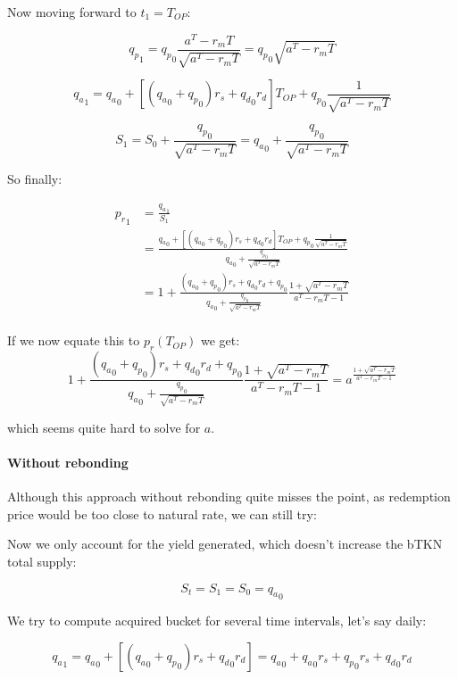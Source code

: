 \documentclass{article}
\begin{document}
Now moving forward to $t_1 = T_{OP}$:

\[
{q_p}_1 = {q_p}_0 \frac{a^T -r_mT}{\sqrt{a^T -r_mT}} = {q_p}_0 \sqrt{a^T - r_mT}
\]

\[
{q_a}_1 = {q_a}_0 + [({q_a}_0 + {q_p}_0)r_s + {q_d}_0 r_d] T_{OP} + {q_p}_0 \frac{1}{\sqrt{a^T - r_mT}}
\]

\[
S_1 = S_0 + \frac{{q_p}_0}{\sqrt{a^T - r_mT}} = {q_a}_0 + \frac{{q_p}_0}{\sqrt{a^T - r_mT}}
\]

So finally:

\begin{equation}
  \label{eq:conservative_p_r_1}
  \begin{split}
    {p_r}_1 & = \frac{{q_a}_1}{S_1} \\
    & = \frac{{q_a}_0 + [({q_a}_0 + {q_p}_0)r_s + {q_d}_0 r_d] T_{OP} + {q_p}_0 \frac{1}{\sqrt{a^T - r_mT}}}{{q_a}_0 + \frac{{q_p}_0}{\sqrt{a^T - r_mT}}} \\
    & = 1 + \frac{({q_a}_0 + {q_p}_0)r_s + {q_d}_0 r_d + {q_p}_0}{{q_a}_0 + \frac{{q_p}_0}{\sqrt{a^T - r_mT}}} \frac{1+ \sqrt{a^T - r_mT}}{a^T - r_mT - 1} \\
  \end{split}
\end{equation}

If we now equate this to $p_r(T_{OP})$ we get:
\begin{equation}
  \label{}
1 + \frac{({q_a}_0 + {q_p}_0)r_s + {q_d}_0 r_d + {q_p}_0}{{q_a}_0 + \frac{{q_p}_0}{\sqrt{a^T - r_mT}}} \frac{1+ \sqrt{a^T - r_mT}}{a^T - r_mT - 1} = a ^{\frac{1+ \sqrt{a^T - r_mT}}{a^T - r_mT - 1}}
\end{equation}

which seems quite hard to solve for $a$.

\paragraph{Without rebonding}

Although this approach without rebonding quite misses the point, as redemption price would be too close to natural rate, we can still try:

Now we only account for the yield generated, which doesn’t increase the bTKN total supply:

\[
S_t = S_1 = S_0 = {q_a}_0
\]

We try to compute acquired bucket for several time intervals, let’s say daily:

\[
{q_a}_1 = {q_a}_0 + [({q_a}_0 + {q_p}_0) r_s + {q_d}_0 r_d] = {q_a}_0 + {q_a}_0 r_s + {q_p}_0 r_s + {q_d}_0 r_d
\]
\end{document}
